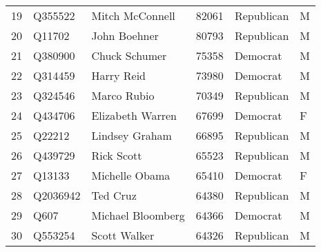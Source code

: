 \begin{table}[h]
\begin{adjustbox}{width=\linewidth, center}
\begin{tabular}{lllrll}
	19 &   Q355522 &    Mitch McConnell &             82061 &  Republican &      M \\
	20 &    Q11702 &       John Boehner &             80793 &  Republican &      M \\
	21 &   Q380900 &      Chuck Schumer &             75358 &    Democrat &      M \\
	22 &   Q314459 &         Harry Reid &             73980 &    Democrat &      M \\
	23 &   Q324546 &        Marco Rubio &             70349 &  Republican &      M \\
	24 &   Q434706 &   Elizabeth Warren &             67699 &    Democrat &      F \\
	25 &    Q22212 &     Lindsey Graham &             66895 &  Republican &      M \\
	26 &   Q439729 &         Rick Scott &             65523 &  Republican &      M \\
	27 &    Q13133 &     Michelle Obama &             65410 &    Democrat &      F \\
	28 &  Q2036942 &           Ted Cruz &             64380 &  Republican &      M \\
	29 &      Q607 &  Michael Bloomberg &             64366 &    Democrat &      M \\
	30 &   Q553254 &       Scott Walker &             64326 &  Republican &      M \\
	\bottomrule
	\end{tabular}
	
\end{adjustbox}
	\end{table}


